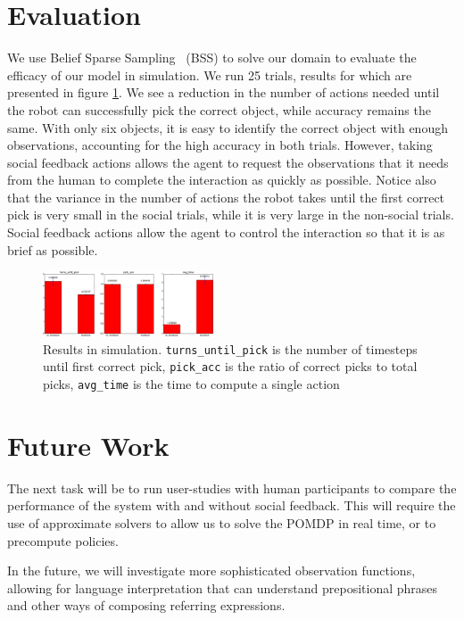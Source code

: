 \documentclass[conference]{IEEEtran}
\begin{document}
\section{Evaluation}

We use Belief Sparse Sampling~\citep{bss} (BSS) to solve our domain to evaluate the efficacy of our model in simulation. We run 25 trials, results for which are presented in figure \ref{fig:toyresults}. We see a reduction in the number of actions needed until the robot can successfully pick the correct object, while accuracy remains the same. With only six objects, it is easy to identify the correct object with enough observations, accounting for the high accuracy in both trials. However, taking social feedback actions allows the agent to request the observations that it needs from the human to complete the interaction as quickly as possible. Notice also that the variance in the number of actions the robot takes until the first correct pick is very small in the social trials, while it is very large in the non-social trials. Social feedback actions allow the agent to control the interaction so that it is as brief as possible. 

\begin{figure}[H]
\begin{center}
	\includegraphics[width=0.45\textwidth]{resources/results}
\end{center}
\caption{Results in simulation. \texttt{turns\_until\_pick} is the number of timesteps until first correct pick,  \texttt{pick\_acc} is the ratio of correct picks to total picks, \texttt{avg\_time} is the time to compute a single action}
	\label{fig:toyresults}
\end{figure}


\section{Future Work}

The next task will be to run user-studies with human participants to compare the performance of the system with and without social feedback. This will require the use of approximate solvers to allow us to solve the POMDP in real time, or to precompute policies. 

In the future, we will investigate more sophisticated observation functions, allowing for language interpretation that can understand prepositional phrases and other ways of composing referring expressions. 
\end{document}
